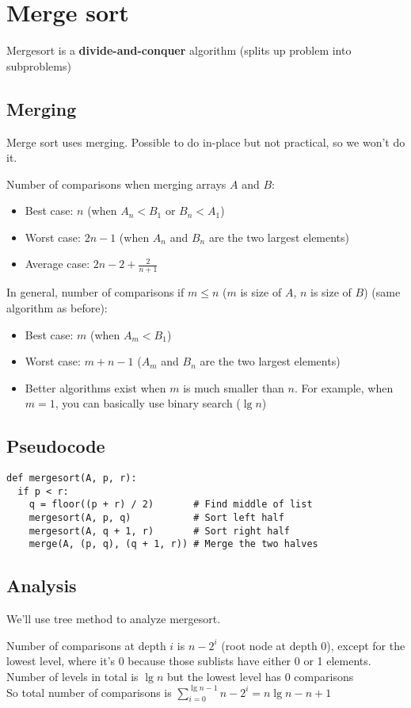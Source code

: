 \section{Merge sort}

Mergesort is a \textbf{divide-and-conquer} algorithm (splits up problem into subproblems)

\subsection*{Merging}

Merge sort uses merging. Possible to do in-place but not practical, so we won't do it.

Number of comparisons when merging arrays $A$ and $B$:
\begin{itemize}
    \item Best case: $n$ (when $A_n < B_1$ or $B_n < A_1$)
    \item Worst case: $2n - 1$ (when $A_n$ and $B_n$ are the two largest elements)
    \item Average case: $\displaystyle 2n - 2 + \frac{2}{n+1}$
\end{itemize}

In general, number of comparisons if $m \leq n$ ($m$ is size of $A$, $n$ is size of $B$) (same algorithm as before):
\begin{itemize}
    \item Best case: $m$ (when $A_m < B_1$)
    \item Worst case: $m + n - 1$ ($A_m$ and $B_n$ are the two largest elements)
    \item Better algorithms exist when $m$ is much smaller than $n$. For example, when $m = 1$, you can basically use binary search ($\lg n$)
\end{itemize}

\subsection*{Pseudocode}

\begin{verbatim}
def mergesort(A, p, r):
  if p < r:
    q = floor((p + r) / 2)       # Find middle of list
    mergesort(A, p, q)           # Sort left half
    mergesort(A, q + 1, r)       # Sort right half
    merge(A, (p, q), (q + 1, r)) # Merge the two halves
\end{verbatim}

\subsection*{Analysis}

We'll use tree method to analyze mergesort.

Number of comparisons at depth $i$ is $n - 2^i$ (root node at depth 0), except for the lowest level, where it's 0 because those sublists have either 0 or 1 elements.\\
Number of levels in total is $\lg n$ but the lowest level has 0 comparisons\\
So total number of comparisons is $\displaystyle \sum_{i=0}^{\lg n - 1} n - 2^i = n\lg n - n + 1$
